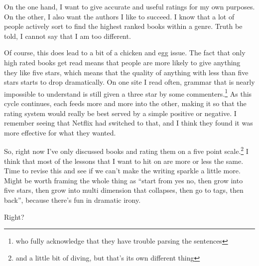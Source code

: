 \documentclass[12pt]{article}[titlepage]
\newcommand{\say}[1]{``#1''}
\newcommand{\1}{\={a}}
\newcommand{\2}{\={e}}
\newcommand{\3}{\={\i}}
\newcommand{\4}{\=o}
\newcommand{\5}{\=u}
\newcommand{\6}{\={A}}
\renewcommand{\,}{\textsuperscript{,}}
\begin{document}
On the one hand, I want to give accurate and useful ratings for my own purposes.
On the other, I also want the authors I like to succeed.
I know that a lot of people actively sort to find the highest ranked books within a genre.
Truth be told, I cannot say that I am too different.

Of course, this does lead to a bit of a chicken and egg issue.
The fact that only high rated books get read means that people are more likely to give anything they like five stars, which means that the quality of anything with less than five stars starts to drop dramatically.
On one site I read often, grammar that is nearly impossible to understand is still given a three star by some commenters.\footnote{who fully acknowledge that they have trouble parsing the sentences}
As this cycle continues, each feeds more and more into the other, making it so that the rating system would really be best served by a simple positive or negative.
I remember seeing that Netflix had switched to that, and I think they found it was more effective for what they wanted.

So, right now I've only discussed books and rating them on a five point scale.\footnote{and a little bit of diving, but that's its own different thing}
I think that most of the lessons that I want to hit on are more or less the same.
Time to revise this and see if we can't make the writing sparkle a little more.
Might be worth framing the whole thing as \say{start from yes no, then grow into five stars, then grow into multi dimension that collapses, then go to tags, then back}, because there's fun in dramatic irony.

Right?
\end{document}
